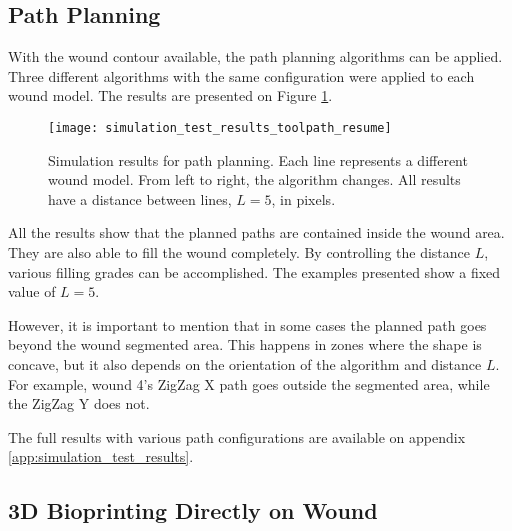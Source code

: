 

\subsection{Path Planning}
\label{subsec:simulated_system_results_path_planning}

With the wound contour available, the path planning algorithms can be applied. Three different algorithms with the same configuration were applied to each wound model. The results are presented on Figure \ref{fig:simulation_test_results_toolpath_resume}.\\

\begin{figure}[htbp]
	\centering
	\texttt{[image: simulation\_test\_results\_toolpath\_resume]}
	\caption[Simulation results for path planning.]{Simulation results for path planning. Each line represents a different wound model. From left to right, the algorithm changes. All results have a distance between lines, $L = 5$, in pixels.}
	\label{fig:simulation_test_results_toolpath_resume}
\end{figure}

All the results show that the planned paths are contained inside the wound area. They are also able to fill the wound completely. By controlling the distance $L$, various filling grades can be accomplished. The examples presented show a fixed value of $L = 5$.

However, it is important to mention that in some cases the planned path goes beyond the wound segmented area. This happens in zones where the shape is concave, but it also depends on the orientation of the algorithm and distance $L$. For example, wound 4's ZigZag X path goes outside the segmented area, while the ZigZag Y does not.

The full results with various path configurations are available on appendix \ref{app:simulation_test_results}.


\subsection{3D Bioprinting Directly on Wound}
\label{subsec:simulated_system_results_bioprinting_directly_wound}

